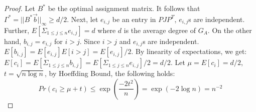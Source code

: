 \begin{proof}
Let $B^*$ be the optimal assignment matrix. It follows that 
$\Gamma^*=||B^*\vec{b}||_\infty \geq d/2$.
Next, %
let $e_{i,j}$ be an entry in $PJP^T$,
$e_{i,j}$s are independent. Further, $E[\Sigma_{1\leq j \leq n}e_{i,j}]=d$ where $d$ is the average degree of $G_A$.
On the other hand, $b_{i,j} =e_{i,j}$ for $i > j$.
%
%
Since $i>j$ and $e_{i,j}$s are independent. 
$E[b_{i,j}] = E[e_{i,j}]E[i>j]= E[e_{i,j}]/2$.
 By linearity 
of expectations,
we get: $E[c_i] = E[\Sigma_{1\leq j \leq n} b_{i,j}]=E[\Sigma_{1\leq j \leq n} e_{i,j}]/2 = d/2$.
 Let $\mu =E[c_i] = d/2$, 
$t = \sqrt{n\log n}$, by Hoeffding Bound, the following holds:
\begin{equation*}
	Pr(c_i \geq \mu + t) \leq \exp(\frac{-2t^2}{n}) = \exp(-2\log n) = n^{-2}
\end{equation*}


\end{proof}
